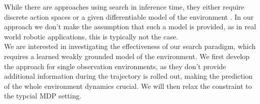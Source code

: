 While there are approaches using search in inference time, they either require discrete action spaces \cite{MUZero} or a given differentiable model of the environment \cite{Lee_Jeon_Kim_Kim_2020}. 
In our approach we 
don't make the assumption that such a model is provided, as in real world robotic applications, this is typically not the case.\\

We are interested in investigating the effectiveness of our search paradigm, which requires a learned weakly grounded model of the environment. We first develop the approach 
for single observation environments, 
as they don't provide additional information during the trajectory is rolled out, making the prediction of the whole environment dynamics crucial. We will then relax the constraint to the typcial 
MDP setting.